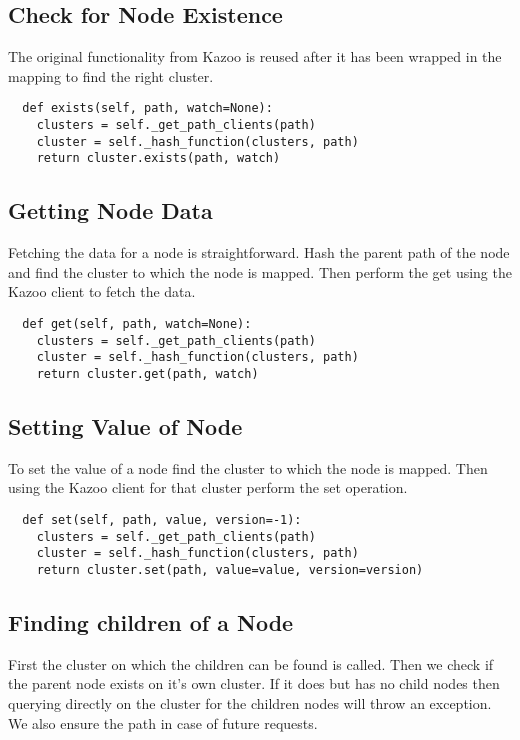 \subsection{Check for Node Existence}
The original functionality from Kazoo is reused after it has been wrapped in the mapping to find the right cluster.

\begin{lstlisting}
  def exists(self, path, watch=None):
    clusters = self._get_path_clients(path)
    cluster = self._hash_function(clusters, path)
    return cluster.exists(path, watch)
\end{lstlisting}

\subsection{Getting Node Data}
Fetching the data for a node is straightforward. Hash the parent path of the node and find the cluster to which the node is mapped. Then perform the get using the Kazoo client to fetch the data.

\begin{lstlisting}
  def get(self, path, watch=None):
    clusters = self._get_path_clients(path)
    cluster = self._hash_function(clusters, path)
    return cluster.get(path, watch)
\end{lstlisting}


\subsection{Setting Value of Node}
To set the value of a node find the cluster to which the node is mapped. Then using the Kazoo client for that cluster perform the set operation. 

\begin{lstlisting}
  def set(self, path, value, version=-1):
    clusters = self._get_path_clients(path)
    cluster = self._hash_function(clusters, path)
    return cluster.set(path, value=value, version=version)
\end{lstlisting}

\subsection{Finding children of a Node}
    First the cluster on which the children can be found is called. Then we check if the parent node exists on it's own cluster. If it does but has no child nodes then querying directly on the cluster for the children nodes will throw an exception. We also ensure the path in case of future requests.

